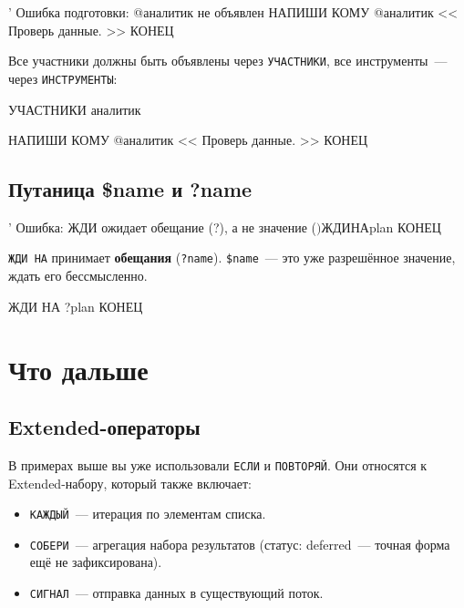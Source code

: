 \documentclass[11pt,a4paper]{article}
\newcommand{\ic}[1]{\texttt{\small #1}}
\begin{document}
\begin{badcode}
' Ошибка подготовки: @аналитик не объявлен
НАПИШИ
  КОМУ @аналитик
  <<
  Проверь данные.
  >>
КОНЕЦ
\end{badcode}

Все участники должны быть объявлены через \ic{УЧАСТНИКИ}, все инструменты~--- через \ic{ИНСТРУМЕНТЫ}:

\begin{code}
УЧАСТНИКИ аналитик

НАПИШИ
  КОМУ @аналитик
  <<
  Проверь данные.
  >>
КОНЕЦ
\end{code}

\subsection{Путаница \$name и ?name}

\begin{badcode}
' Ошибка: ЖДИ ожидает обещание (?), а не значение ($)
ЖДИ
  НА $plan
КОНЕЦ
\end{badcode}

\ic{ЖДИ НА} принимает \textbf{обещания} (\ic{?name}). \ic{\$name}~--- это уже разрешённое значение, ждать его бессмысленно.

\begin{code}
ЖДИ
  НА ?plan
КОНЕЦ
\end{code}



\section{Что дальше}

\subsection{Extended-операторы}

В примерах выше вы уже использовали \ic{ЕСЛИ} и \ic{ПОВТОРЯЙ}. Они относятся к Extended-набору, который также включает:

\begin{itemize}[leftmargin=2em]
\item \ic{КАЖДЫЙ}~--- итерация по элементам списка.
\item \ic{СОБЕРИ}~--- агрегация набора результатов (статус: deferred~--- точная форма ещё не зафиксирована).
\item \ic{СИГНАЛ}~--- отправка данных в существующий поток.
\end{itemize}
\end{document}
